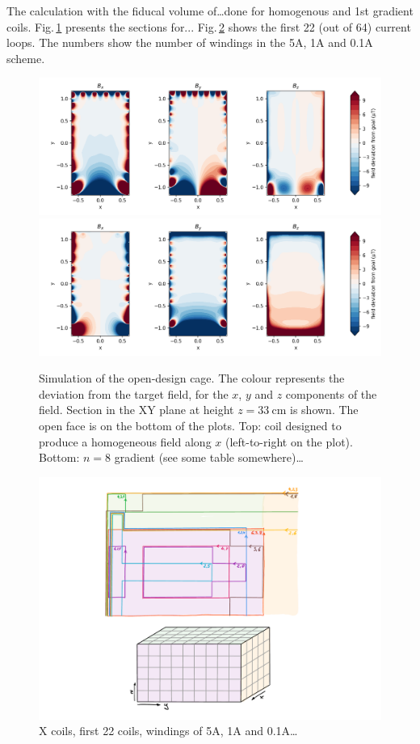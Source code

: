 The calculation with the fiducal volume of\ldots done for homogenous and 1st gradient coils. Fig.\,\ref{fig:prototype_open_design_simulation} presents the sections for... Fig.\,\ref{fig:prototype_open_design_Xcoil_coils} shows the first 22 (out of 64) current loops.  The numbers show the number of windings in the 5A, 1A and 0.1A scheme.

\begin{figure}
  \centering
  \includegraphics[width=\linewidth]{gfx/prototype/open_design_Xcoil_field_XY_z0_33.png}
  \includegraphics[width=\linewidth]{gfx/prototype/open_design_n8coil_field_XY_z0_33.png}
  \caption{Simulation of the open-design cage. The colour represents the deviation from the target field, for the $x$, $y$ and $z$ components of the field. Section in the XY plane at height $z=\SI{33}{\centi\meter}$ is shown. The open face is on the bottom of the plots. Top: coil designed to produce a homogeneous field along $x$ (left-to-right on the plot). Bottom: $n=8$ gradient (see some table somewhere)\ldots}
  \label{fig:prototype_open_design_simulation}
\end{figure}

\begin{figure}
  \centering
  \includegraphics[width=\linewidth]{gfx/prototype/open_design_Xcoil_coils.pdf}
  \caption{X coils, first 22 coils, windings of 5A, 1A and 0.1A\ldots}
  \label{fig:prototype_open_design_Xcoil_coils}
\end{figure}
